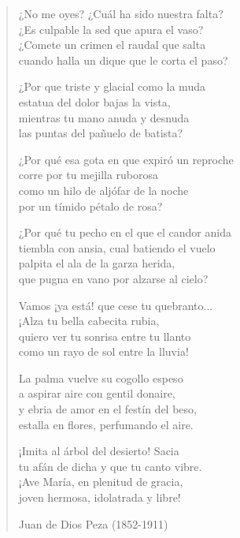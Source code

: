 \documentclass[12pt, twoside]{book}
\begin{document}
\begin{verse}
¿No me oyes? ¿Cuál ha sido nuestra falta?\\
¿Es culpable la sed que apura el vaso?\\
¿Comete un crimen el raudal que salta\\
cuando halla un dique que le corta el paso?
\newline

¿Por que triste y glacial como la muda\\
estatua del dolor bajas la vista,\\
mientras tu mano anuda y desnuda\\
las puntas del pañuelo de batista?
\newline

¿Por qué esa gota en que expiró un reproche\\
corre por tu mejilla ruborosa\\
como un hilo de aljófar de la noche\\
por un tímido pétalo de rosa?
\newline

¿Por qué tu pecho en el que el candor anida\\
tiembla con ansia, cual batiendo el vuelo \\
palpita el ala de la garza herida,\\
que pugna en vano por alzarse al cielo?
\newline

Vamos ¡ya está! que cese tu quebranto...\\
¡Alza tu bella cabecita rubia,\\
quiero ver tu sonrisa entre tu llanto\\
como un rayo de sol entre la lluvia!
\newline

La palma vuelve su cogollo espeso\\
a aspirar aire con gentil donaire,\\
y ebria de amor en el festín del beso,\\
estalla en flores, perfumando el aire.
\newpage

¡Imita al árbol del desierto! Sacia\\
tu afán de dicha y que tu canto vibre.\\
¡Ave María, en plenitud de gracia,\\
joven hermosa, idolatrada y libre!
\newline

Juan de Dios Peza (1852-1911)
\end{verse}
\end{document}
